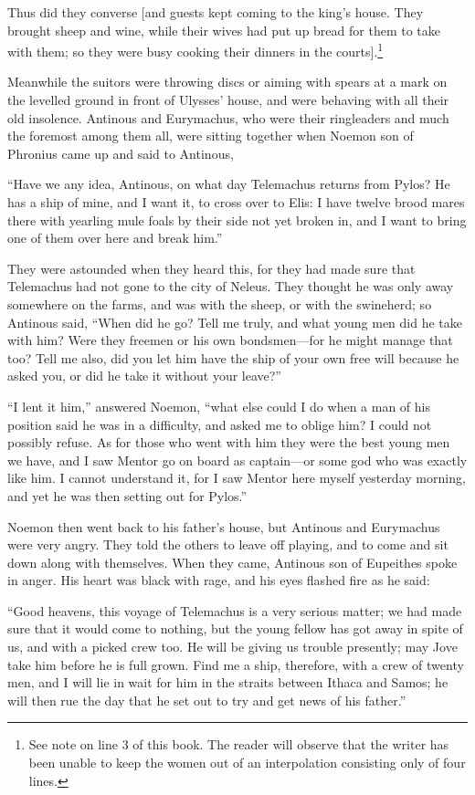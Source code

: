 Thus did they converse [and guests kept coming to the king’s house. They
brought sheep and wine, while their wives had put up bread for them to take
with them; so they were busy cooking their dinners in the courts].\footnote{See note on line 3 of this book. The reader will observe that the writer has
been unable to keep the women out of an interpolation consisting only of four
lines.}

Meanwhile the suitors were throwing discs or aiming with spears at a mark on
the levelled ground in front of Ulysses’ house, and were behaving with all
their old insolence. Antinous and Eurymachus, who were their ringleaders and
much the foremost among them all, were sitting together when Noemon son of
Phronius came up and said to Antinous,

“Have we any idea, Antinous, on what day Telemachus returns from Pylos? He has
a ship of mine, and I want it, to cross over to Elis: I have twelve brood mares
there with yearling mule foals by their side not yet broken in, and I want to
bring one of them over here and break him.”

They were astounded when they heard this, for they had made sure that
Telemachus had not gone to the city of Neleus. They thought he was only away
somewhere on the farms, and was with the sheep, or with the swineherd; so
Antinous said, “When did he go? Tell me truly, and what young men did he take
with him? Were they freemen or his own bondsmen—for he might manage that too?
Tell me also, did you let him have the ship of your own free will because he
asked you, or did he take it without your leave?”

“I lent it him,” answered Noemon, “what else could I do when a man of his
position said he was in a difficulty, and asked me to oblige him? I could not
possibly refuse. As for those who went with him they were the best young men we
have, and I saw Mentor go on board as captain—or some god who was exactly like
him. I cannot understand it, for I saw Mentor here myself yesterday morning,
and yet he was then setting out for Pylos.”

Noemon then went back to his father’s house, but Antinous and Eurymachus were
very angry. They told the others to leave off playing, and to come and sit down
along with themselves. When they came, Antinous son of Eupeithes spoke in
anger. His heart was black with rage, and his eyes flashed fire as he said:

“Good heavens, this voyage of Telemachus is a very serious matter; we had made
sure that it would come to nothing, but the young fellow has got away in spite
of us, and with a picked crew too. He will be giving us trouble presently; may
Jove take him before he is full grown. Find me a ship, therefore, with a crew
of twenty men, and I will lie in wait for him in the straits between Ithaca and
Samos; he will then rue the day that he set out to try and get news of his
father.”

